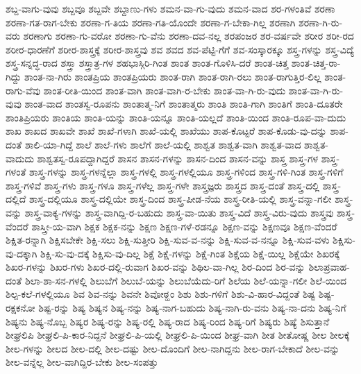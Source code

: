 {ಶಬ್ದ-ವಾಗು-ವುವು
ಶಬ್ದವೂ
ಶಬ್ದವೇ
ಶಬ್ದಾಣು-ಗಳು
ಶಮನ-ವಾ-ಗು-ವುದು
ಶಮನ-ವಾದ
ಶರ-ಗಳಂತಿವೆ
ಶರಣಾ
ಶರಣಾ-ಗತ-ರಾಗ-ಬೇಕು
ಶರಣಾ-ಗ-ತಿಯ
ಶರಣಾ-ಗತಿ-ಯೊಂದೇ
ಶರಣಾ-ಗ-ಬೇಕಾ-ಗಿಲ್ಲ
ಶರಣಾಗಿ
ಶರಣಾ-ಗಿ-ರು-ವರು
ಶರಣಾಗು
ಶರಣಾ-ಗು-ವರೋ
ಶರಣಾ-ಗು-ವೆನು
ಶರಣಾ-ದವ-ನಲ್ಲ
ಶರಪಂಜರ
ಶರ-ವರ್ಷವೇ
ಶರೀರ
ಶರೀ-ರದ
ಶರೀರ-ಧಾರಣೆಗೆ
ಶರೀರ-ಶಾಸ್ತ್ರಕ್ಕೆ
ಶರೀರ-ಶಾಸ್ತ್ರವು
ಶವ
ಶವದ
ಶವ-ಪೆಟ್ಟಿ-ಗೆಗೆ
ಶವ-ಸಂಸ್ಕಾರಕ್ಕೂ
ಶಸ್ತ್ರ-ಗಳನ್ನು
ಶಸ್ತ್ರ-ವಿದ್ಯೆ
ಶಸ್ತ್ರ-ಸನ್ನದ್ಧ-ರಾದ
ಶಸ್ತ್ರಾ
ಶಸ್ತ್ರಾತ್ರ-ಗಳ
ಶಹಭಾಸ್ಗಿರಿ-ಗಿಂತ
ಶಾಂತ
ಶಾಂತ-ಗೊಳಿಸಿ-ದರೆ
ಶಾಂತ-ಚಿತ್ತ
ಶಾಂತ-ಚಿತ್ತ-ರಾ-ಗಿದ್ದು
ಶಾಂತ-ನಾ-ಗಿರು
ಶಾಂತಪ್ರಿಯ
ಶಾಂತಪ್ರಿಯರು
ಶಾಂತ-ರಾಗಿ
ಶಾಂತ-ರಾಗಿ-ರಲು
ಶಾಂತ-ರಾಗುತ್ತಿರ-ಲಿಲ್ಲ
ಶಾಂತ-ರಾಗು-ವೆವು
ಶಾಂತ-ರೀತಿ-ಯಿಂದ
ಶಾಂತ-ವಾಗಿ
ಶಾಂತ-ವಾಗಿ-ರ-ಬೇಕು
ಶಾಂತ-ವಾ-ಗಿ-ರು-ವುದು
ಶಾಂತ-ವಾ-ಗಿ-ರು-ವುವು
ಶಾಂತ-ವಾದ
ಶಾಂತಸ್ವ-ರೂಪನು
ಶಾಂತಾತ್ಮ-ನಿಗೆ
ಶಾಂತಾತ್ಮರು
ಶಾಂತಿ
ಶಾಂತಿ-ಗಾಗಿ
ಶಾಂತಿಗೆ
ಶಾಂತಿ-ದೂತರೇ
ಶಾಂತಿಪ್ರಿಯರು
ಶಾಂತಿಯ
ಶಾಂತಿ-ಯನ್ನು
ಶಾಂತಿ-ಯನ್ನೂ
ಶಾಂತಿ-ಯಲ್ಲದೆ
ಶಾಂತಿ-ಯಿಂದ
ಶಾಂತಿ-ರೂಪ-ವಾ-ದುದು
ಶಾಖ
ಶಾಖದ
ಶಾಖವೇ
ಶಾಖೆ
ಶಾಖೆ-ಗಳಾಗಿ
ಶಾಖೆ-ಯಲ್ಲಿ
ಶಾಖೆಯು
ಶಾಪ-ಕೊಟ್ಟರೆ
ಶಾಪ-ಕೊಡು-ವು-ದನ್ನು
ಶಾಪ-ದಂತೆ
ಶಾಲಿ-ಯಾ-ಗಿದ್ದೆ
ಶಾಲೆ
ಶಾಲೆ-ಗಳು
ಶಾಲೆಗೆ
ಶಾಲೆ-ಯಲ್ಲಿ
ಶಾಶ್ವತ
ಶಾಶ್ವತ-ವಾಗಿ
ಶಾಶ್ವತ-ವಾದ
ಶಾಶ್ವತ-ವಾದುದು
ಶಾಶ್ವತಸ್ವ-ರೂಪದ್ದಾಗಿದ್ದರೆ
ಶಾಸನ
ಶಾಸನ-ಗಳನ್ನು
ಶಾಸನ-ದಿಂದ
ಶಾಸನ-ವನ್ನು
ಶಾಸ್ತ್ರ
ಶಾಸ್ತ್ರ-ಗಳ
ಶಾಸ್ತ್ರ-ಗಳಂತೆ
ಶಾಸ್ತ್ರ-ಗಳನ್ನು
ಶಾಸ್ತ್ರ-ಗಳನ್ನೆಲ್ಲಾ
ಶಾಸ್ತ್ರ-ಗಳಲ್ಲಿ
ಶಾಸ್ತ್ರ-ಗಳಲ್ಲಿಯೂ
ಶಾಸ್ತ್ರ-ಗಳಿಂದ
ಶಾಸ್ತ್ರ-ಗಳಿ-ಗಿಂತ
ಶಾಸ್ತ್ರ-ಗಳಿಗೆ
ಶಾಸ್ತ್ರ-ಗಳಿವೆ
ಶಾಸ್ತ್ರ-ಗಳು
ಶಾಸ್ತ್ರ-ಗಳೂ
ಶಾಸ್ತ್ರ-ಗಳೆಲ್ಲ
ಶಾಸ್ತ್ರ-ಗಳೇ
ಶಾಸ್ತ್ರಜ್ಞರು
ಶಾಸ್ತ್ರದ
ಶಾಸ್ತ್ರ-ದಂತೆ
ಶಾಸ್ತ್ರ-ದಲ್ಲಿ
ಶಾಸ್ತ್ರ-ದಲ್ಲಿದೆ
ಶಾಸ್ತ್ರ-ದಲ್ಲಿಯೂ
ಶಾಸ್ತ್ರ-ದಲ್ಲಿಯೇ
ಶಾಸ್ತ್ರ-ದಿಂದ
ಶಾಸ್ತ್ರ-ಪೀಡ-ನೆಯ
ಶಾಸ್ತ್ರ-ರೀತಿ-ಯಲ್ಲಿ
ಶಾಸ್ತ್ರ-ವನ್ನಾ-ಗಲೀ
ಶಾಸ್ತ್ರ-ವನ್ನು
ಶಾಸ್ತ್ರ-ವಾಕ್ಯ-ಗಳನ್ನು
ಶಾಸ್ತ್ರ-ವಾಗಿದ್ದಿ-ರ-ಬಹುದು
ಶಾಸ್ತ್ರ-ವಾ-ಯಿತು
ಶಾಸ್ತ್ರ-ವಿದೆ
ಶಾಸ್ತ್ರ-ವಿರು-ವುದು
ಶಾಸ್ತ್ರವು
ಶಾಸ್ತ್ರ-ವೆಂದರೆ
ಶಾಸ್ತ್ರೀ-ಯ-ವಾಗಿ
ಶಿಕ್ಷಕ
ಶಿಕ್ಷಕ-ನನ್ನು
ಶಿಕ್ಷಣ
ಶಿಕ್ಷಣ-ಗಳೆ-ರಡನ್ನೂ
ಶಿಕ್ಷಣ-ವನ್ನು
ಶಿಕ್ಷಣವೂ
ಶಿಕ್ಷಣ-ವೆಂದರೆ
ಶಿಕ್ಷಿತ-ರನ್ನಾಗಿ
ಶಿಕ್ಷಿಸಬೇಕೇ
ಶಿಕ್ಷಿ-ಸಲು
ಶಿಕ್ಷಿ-ಸುತ್ತೀರಿ
ಶಿಕ್ಷಿ-ಸುವ-ವ-ನನ್ನು
ಶಿಕ್ಷಿ-ಸುವ-ವ-ನನ್ನೂ
ಶಿಕ್ಷಿ-ಸುವ-ವಳು
ಶಿಕ್ಷಿಸು-ವು-ದಕ್ಕಾಗಿ
ಶಿಕ್ಷಿ-ಸು-ವು-ದಕ್ಕೆ
ಶಿಕ್ಷಿಸು-ವು-ದಿಲ್ಲ
ಶಿಕ್ಷೆ
ಶಿಕ್ಷೆ-ಗಳನ್ನು
ಶಿಕ್ಷೆ-ಗಿಂತ
ಶಿಕ್ಷೆಯ
ಶಿಕ್ಷೆ-ಯಿಲ್ಲ
ಶಿಕ್ಷೆಯೇ
ಶಿಖರಕ್ಕೆ
ಶಿಖರ-ಗಳನ್ನು
ಶಿಖರ-ಗಳು
ಶಿಖರ-ದಲ್ಲಿ-ರುವಾಗ
ಶಿಖರ-ವನ್ನು
ಶಿಥಿಲ-ವಾ-ಗಿಲ್ಲ
ಶಿರ-ದಿಂದ
ಶಿರ-ವನ್ನು
ಶಿಲಾಪ್ರವಾಹ-ದಂತೆ
ಶಿಲಾ-ಶಾ-ಸನ-ಗಳಲ್ಲಿ
ಶಿಲುಬೆಗೆ
ಶಿಲುಬೆ-ಯನ್ನು
ಶಿಲುಬೆಯೆದು-ರಿಗೆ
ಶಿಲೆಯ
ಶಿಲೆ-ಯನ್ನಾ-ಗಲೀ
ಶಿಲೆ-ಯಿಂದ
ಶಿಲ್ಪ-ಕಲೆ-ಗಳಲ್ಲಿಯೂ
ಶಿವ
ಶಿವ-ನನ್ನು
ಶಿವನೇ
ಶಿವೋಠ್ಹಂ
ಶಿಶು
ಶಿಶು-ಗಳಿಗೆ
ಶಿಶು-ವಿ-ಹಾರ-ವಿದ್ದಂತೆ
ಶಿಷ್ಟ
ಶಿಷ್ಟ-ರಕ್ಷಕನೋ
ಶಿಷ್ಟ-ರನ್ನು
ಶಿಷ್ಯ
ಶಿಷ್ಯನ
ಶಿಷ್ಯ-ನನ್ನು
ಶಿಷ್ಯ-ನಾಗ-ಬಹುದು
ಶಿಷ್ಯ-ನಾಗಿ-ರು-ವನು
ಶಿಷ್ಯ-ನಾ-ದನು
ಶಿಷ್ಯ-ನಿಗೆ
ಶಿಷ್ಯನು
ಶಿಷ್ಯ-ನೊಬ್ಬ
ಶಿಷ್ಯರ
ಶಿಷ್ಯ-ರನ್ನು
ಶಿಷ್ಯ-ರಲ್ಲಿ
ಶಿಷ್ಯ-ರಾದ
ಶಿಷ್ಯ-ರಿಂದ
ಶಿಷ್ಯ-ರಿಗೆ
ಶಿಷ್ಯರು
ಶಿಷ್ಯೆ
ಶಿಸುತ್ತಾನೆ
ಶೀಘ್ರಲಿಪಿ
ಶೀಘ್ರಲಿ-ಪಿ-ಕಾರ-ನಿದ್ದನೆ
ಶೀಘ್ರಲಿ-ಪಿ-ಯಲ್ಲಿ
ಶೀಘ್ರಲಿ-ಪಿ-ಯಿಂದ
ಶೀಘ್ರ-ವಾಗಿ
ಶೀತ
ಶೀತೋಷ್ಣ
ಶೀಲ
ಶೀಲಕ್ಕೆ
ಶೀಲ-ಗಳನ್ನು
ಶೀಲದ
ಶೀಲ-ದಲ್ಲಿ
ಶೀಲ-ದಷ್ಟು
ಶೀಲ-ದೊಂದಿಗೆ
ಶೀಲ-ನಾಗಿದ್ದನು
ಶೀಲ-ರಾಗ-ಬೇಕಾದೆ
ಶೀಲ-ವನ್ನು
ಶೀಲ-ವನ್ನೆಲ್ಲ
ಶೀಲ-ವಾಗಿದ್ದಿರ-ಬೇಕು
ಶೀಲ-ಸಂಪತ್ತು
}
